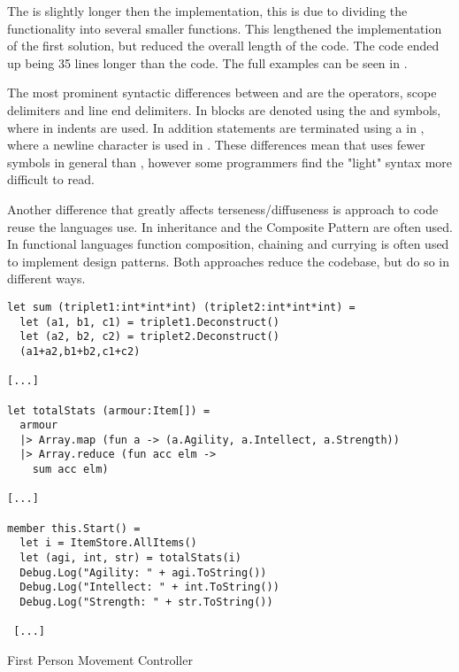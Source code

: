 The \fs is slightly longer then the \cs implementation, this is due to dividing the functionality into several smaller functions. This lengthened the implementation of the first solution, but reduced the overall length of the code. The \cs code ended up being 35 lines longer than the \fs code. The full examples can be seen in .

The most prominent syntactic differences between \cs and \fs are the operators, scope delimiters and line end delimiters. In \cs blocks are denoted using the \m{\{} and \m{\}} symbols, where in \fs indents are used. In addition statements are terminated using a \m{;} in \cs, where a newline character is used in \fs. These differences mean that \fs uses fewer symbols in general than \cs, however some programmers find the "light" syntax more difficult to read\cite{fsharp:light:love}.

Another difference that greatly affects terseness/diffuseness is approach to code reuse the languages use. In \cs inheritance and the Composite Pattern\cite{composite:pattern} are often used\cite{csharp:composite:pattern}. In functional languages function composition, chaining and currying is often used to implement design patterns\cite{functional:design:patterns}. Both approaches reduce the codebase, but do so in different ways.

\begin{listing}[H]
\begin{verbatim}
let sum (triplet1:int*int*int) (triplet2:int*int*int) =
  let (a1, b1, c1) = triplet1.Deconstruct()
  let (a2, b2, c2) = triplet2.Deconstruct()
  (a1+a2,b1+b2,c1+c2)

[...]

let totalStats (armour:Item[]) =
  armour
  |> Array.map (fun a -> (a.Agility, a.Intellect, a.Strength))
  |> Array.reduce (fun acc elm ->
    sum acc elm)

[...]

member this.Start() =
  let i = ItemStore.AllItems()
  let (agi, int, str) = totalStats(i)
  Debug.Log("Agility: " + agi.ToString())
  Debug.Log("Intellect: " + int.ToString())
  Debug.Log("Strength: " + str.ToString())

 [...]
\end{verbatim}
\caption{First Person Movement Controller \fs}
\label{lst:fs-armour}
\end{listing}
